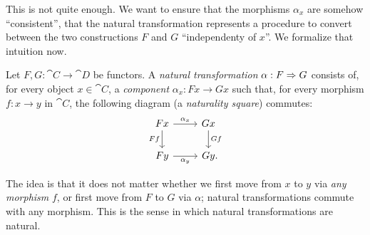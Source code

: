This is not quite enough. We want to ensure that the morphisms $\alpha_x$ are
somehow ``consistent'', that the natural transformation represents a procedure to
convert between the two constructions $F$ and $G$ ``independenty of $x$''. We
formalize that intuition now.

\begin{dfn}\label{def:natural transformation}
  Let $F, G: \cat{C}\to\cat{D}$ be functors. A \emph{natural transformation}
  $\alpha: F\Rightarrow G$ consists of, for every object $x\in\cat{C}$, a
  \emph{component} $\alpha_x: Fx\to Gx$ such that, for every morphism $f: x\to
  y$ in $\cat{C}$, the following diagram (a \emph{naturality square}) commutes:
  \[
    \begin{tikzcd}
      Fx\ar[r, "\alpha_x"]\ar[d, "Ff"'] & Gx\ar[d, "Gf"] \\
      Fy\ar[r, "\alpha_y"'] & Gy\punctuation{.}
    \end{tikzcd}
  \]
\end{dfn}

The idea is that it does not matter whether we first move from $x$ to $y$ via
\emph{any morphism} $f$, or first move from $F$ to $G$ via $\alpha$; natural
transformations commute with any morphism. This is the sense in which natural
transformations are natural.

